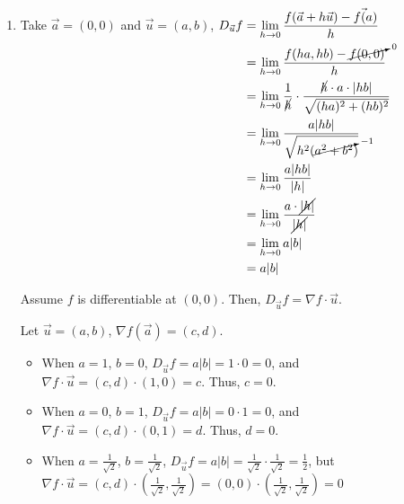\begin{enumerate}[label=\alph*)]
    \item Take $\vec{a} = (0,0)$ and $\vec{u} = (a,b)$,
    $\begin{aligned}[t]
        D_{\vec{u}} f
         & = \lim_{h\to0} \frac{f(\vec{a} + h\vec{u}) - f\vec(a)}{h}                                                \\
         & = \lim_{h\to0} \frac{f(ha, hb) - \cancelto{0}{f(0, 0)}}{h}                                               \\
         & = \lim_{h\to0} \frac{1}{\cancel{h}} \cdot \frac{\cancel{h} \cdot a \cdot | hb |}{\sqrt{(ha)^2 + (hb)^2}} \\
         & = \lim_{h\to0} \frac{a | hb |}{\sqrt{h^2(\cancelto{-1}{a^2 + b^2})}}                                     \\
         & = \lim_{h\to0} \frac{a | hb |}{| h |}                                                                    \\
         & = \lim_{h\to0} \frac{a \cdot \cancel{| h |}}{\cancel{| h |}}                                             \\
         & = \lim_{h\to0} a | b |                                                                                   \\
         & = a | b |
    \end{aligned}$

    Assume $f$ is differentiable at $(0,0)$. Then, $D_{\vec{u}} f = \nabla f \cdot \vec{u}$. 

    Let $\vec{u} = (a, b)$, $\nabla f(\vec{a}) = (c, d)$. 

    \begin{itemize}
        \item When $a = 1$, $b = 0$,  $D_{\vec{u}} f = a|b| = 1 \cdot 0 = 0$, and $\nabla f \cdot \vec{u} = (c, d) \cdot (1, 0) = c$. Thus, $c = 0$. 
        \item When $a = 0$, $b = 1$,  $D_{\vec{u}} f = a|b| = 0 \cdot 1 = 0$, and $\nabla f \cdot \vec{u} = (c, d) \cdot (0, 1) = d$. Thus, $d = 0$. 
        \item When $a = \frac{1}{\sqrt{2}}$, $b = \frac{1}{\sqrt{2}}$, $D_{\vec{u}} f = a|b| = \frac{1}{\sqrt{2}} \cdot \frac{1}{\sqrt{2}} = \frac{1}{2}$, but $\nabla f \cdot \vec{u} = (c, d) \cdot \left(\frac{1}{\sqrt{2}}, \frac{1}{\sqrt{2}} \right) = (0,0) \cdot \left(\frac{1}{\sqrt{2}}, \frac{1}{\sqrt{2}} \right) = 0$
    \end{itemize}


\end{enumerate}
